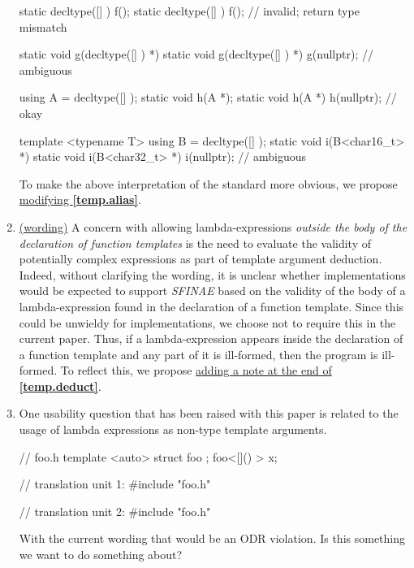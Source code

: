 \documentclass{wg21}
\begin{document}
\begin{enumerate}
\begin{cpp}
static decltype([] { }) f();
static decltype([] { }) f(); // invalid; return type mismatch

static void g(decltype([] { }) *) { }
static void g(decltype([] { }) *) { }
g(nullptr); // ambiguous

using A = decltype([] { });
static void h(A *);
static void h(A *) { }
h(nullptr); // okay

template <typename T>
using B = decltype([] { });
static void i(B<char16_t> *) { }
static void i(B<char32_t> *) { }
i(nullptr); // ambiguous
\end{cpp}

    To make the above interpretation of the standard more obvious, we propose
    \hyperref[wording.redeclarations]{modifying \textbf{[temp.alias]}}.


  \item \label{discussion.sfinae}
    \hyperref[wording.sfinae]{(wording)}
    A concern with allowing lambda-expressions \textit{outside the body of
    the declaration of function templates} is the need to evaluate the validity
    of potentially complex expressions as part of template argument deduction.
    Indeed, without clarifying the wording, it is unclear whether implementations
    would be expected to support \textit{SFINAE} based on the validity of
    the body of a lambda-expression found in the declaration of a function
    template. Since this could be unwieldy for implementations, we choose not
    to require this in the current paper. Thus, if a lambda-expression appears
    inside the declaration of a function template and any part of it is ill-formed,
    then the program is ill-formed. To reflect this, we propose
    \hyperref[wording.sfinae]{adding a note at the end of \textbf{[temp.deduct]}}.

  \item \label{discussion.nontype}
    One usability question that has been raised with this paper is related
    to the usage of lambda expressions as non-type template arguments.

\begin{cpp}
// foo.h
template <auto> struct foo { };
foo<[]() {}> x;

// translation unit 1:
#include "foo.h"

// translation unit 2:
#include "foo.h"
\end{cpp}

    With the current wording that would be an ODR violation. Is this something
    we want to do something about?

\end{enumerate}
\end{document}
